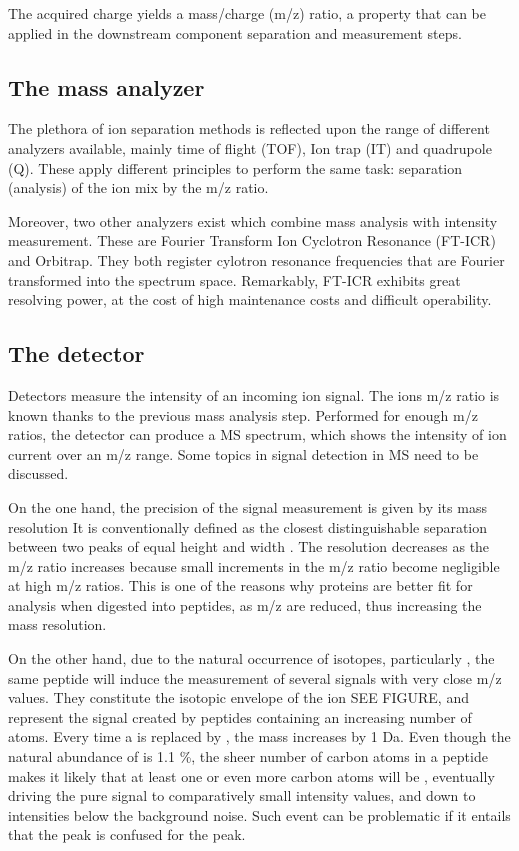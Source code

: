 \documentclass[11pt, a4paper]{report}
\begin{document}
The acquired charge yields a mass/charge (\ac{m/z}) ratio, a property that can be applied in the downstream component separation and measurement steps.

\subsection{The mass analyzer}
\label{subsec:the_mass_analyzer}

The plethora of ion separation methods is reflected upon the range of different analyzers available, mainly time of flight (\ac{TOF}), Ion trap (\ac{IT}) and quadrupole (\ac{Q}). These apply different principles to perform the same task: separation (analysis) of the ion mix by the \ac{m/z} ratio.

Moreover, two other analyzers exist which combine mass analysis with intensity measurement. These are Fourier Transform Ion Cyclotron Resonance (\ac{FT-ICR}) and Orbitrap. They both register cylotron resonance frequencies that are Fourier transformed into the spectrum space. Remarkably, \ac{FT-ICR} exhibits great resolving power, at the cost of high maintenance costs and difficult operability. 

\subsection{The detector}
\label{subsec:the_detector}

Detectors measure the intensity of an incoming ion signal. The ion\textquotesingle s \ac{m/z} ratio is known thanks to the previous mass analysis step. Performed for enough \ac{m/z} ratios, the detector can produce a \ac{MS} spectrum, which shows the intensity of ion current over an \ac{m/z} range. Some topics in signal detection in \ac{MS} need to be discussed.

On the one hand, the precision of the signal measurement is given by its mass resolution It is conventionally defined as the closest distinguishable separation between two peaks of equal height and width \cite{Marshall2013}. The resolution decreases as the \ac{m/z} ratio increases because small increments in the \ac{m/z} ratio become negligible at high \ac{m/z} ratios. This is one of the reasons why proteins are better fit for analysis when digested into peptides, as \ac{m/z} are reduced, thus increasing the mass resolution.

On the other hand, due to the natural occurrence of isotopes, particularly , the same peptide will induce the measurement of several signals with very close \ac{m/z} values. They constitute the isotopic envelope of the ion SEE FIGURE, and represent the signal created by peptides containing an increasing number of  atoms. Every time a  is replaced by , the mass increases by 1 Da. Even though the natural abundance of  is 1.1 \%, the sheer number of carbon atoms in a peptide makes it likely that at least one or even more carbon atoms will be , eventually driving the pure  signal to comparatively small intensity values, and down to intensities below the background noise. Such event can be problematic if it entails that the  peak is confused for the  peak.
\end{document}
